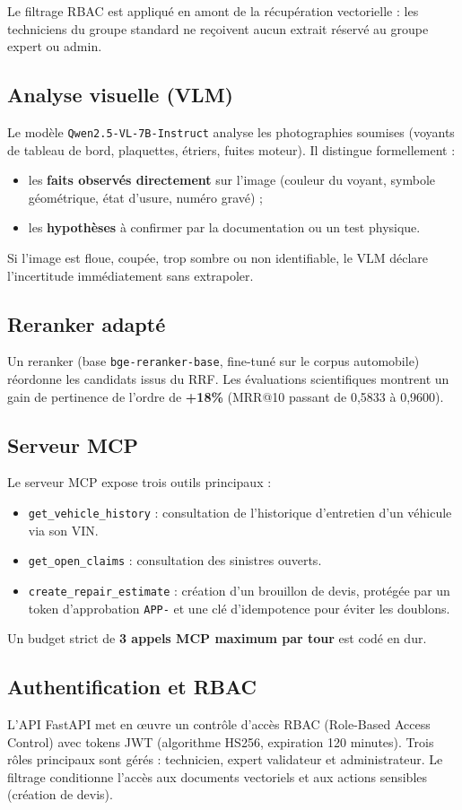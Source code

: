 \documentclass[11pt,a4paper]{article}
\begin{document}
Le filtrage RBAC est appliqué en amont de la récupération vectorielle : les techniciens du groupe standard ne reçoivent aucun extrait réservé au groupe expert ou admin.

\subsection{Analyse visuelle (VLM)}
Le modèle \texttt{Qwen2.5-VL-7B-Instruct} analyse les photographies soumises (voyants de tableau de bord, plaquettes, étriers, fuites moteur). Il distingue formellement :
\begin{itemize}[leftmargin=*]
  \item les \textbf{faits observés directement} sur l'image (couleur du voyant, symbole géométrique, état d'usure, numéro gravé) ;
  \item les \textbf{hypothèses} à confirmer par la documentation ou un test physique.
\end{itemize}
Si l'image est floue, coupée, trop sombre ou non identifiable, le VLM déclare l'incertitude immédiatement sans extrapoler.

\subsection{Reranker adapté}
Un reranker (base \texttt{bge-reranker-base}, fine-tuné sur le corpus automobile) réordonne les candidats issus du RRF. Les évaluations scientifiques montrent un gain de pertinence de l'ordre de \textbf{+18\%} (MRR@10 passant de 0,5833 à 0,9600).

\subsection{Serveur MCP}
Le serveur MCP expose trois outils principaux :
\begin{itemize}[leftmargin=*]
  \item \texttt{get\_vehicle\_history} : consultation de l'historique d'entretien d'un véhicule via son VIN.
  \item \texttt{get\_open\_claims} : consultation des sinistres ouverts.
  \item \texttt{create\_repair\_estimate} : création d'un brouillon de devis, protégée par un token d'approbation \texttt{APP-} et une clé d'idempotence pour éviter les doublons.
\end{itemize}
Un budget strict de \textbf{3 appels MCP maximum par tour} est codé en dur.

\subsection{Authentification et RBAC}
L'API FastAPI met en œuvre un contrôle d'accès RBAC (Role-Based Access Control) avec tokens JWT (algorithme HS256, expiration 120 minutes). Trois rôles principaux sont gérés : technicien, expert validateur et administrateur. Le filtrage conditionne l'accès aux documents vectoriels et aux actions sensibles (création de devis).
\end{document}
